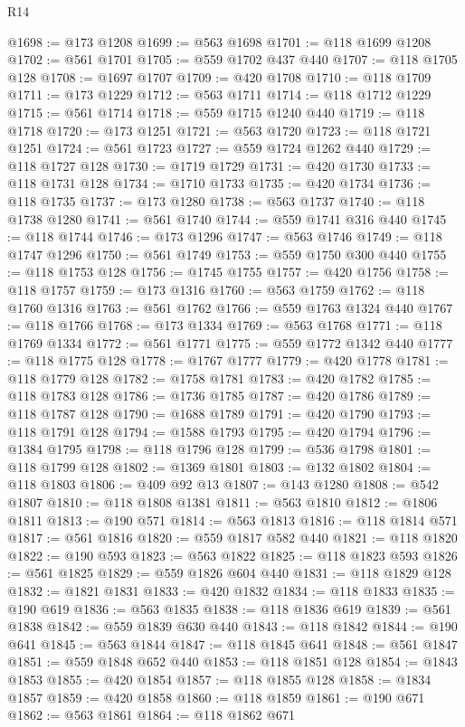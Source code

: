 \begin{lexlean}{R14}
\begin{coremodule}
@1698 := @173 @1208
@1699 := @563 @1698
@1701 := @118 @1699 @1208
@1702 := @561 @1701
@1705 := @559 @1702 @437 @440
@1707 := @118 @1705 @128
@1708 := @1697 @1707
@1709 := @420 @1708
@1710 := @118 @1709
@1711 := @173 @1229
@1712 := @563 @1711
@1714 := @118 @1712 @1229
@1715 := @561 @1714
@1718 := @559 @1715 @1240 @440
@1719 := @118 @1718
@1720 := @173 @1251
@1721 := @563 @1720
@1723 := @118 @1721 @1251
@1724 := @561 @1723
@1727 := @559 @1724 @1262 @440
@1729 := @118 @1727 @128
@1730 := @1719 @1729
@1731 := @420 @1730
@1733 := @118 @1731 @128
@1734 := @1710 @1733
@1735 := @420 @1734
@1736 := @118 @1735
@1737 := @173 @1280
@1738 := @563 @1737
@1740 := @118 @1738 @1280
@1741 := @561 @1740
@1744 := @559 @1741 @316 @440
@1745 := @118 @1744
@1746 := @173 @1296
@1747 := @563 @1746
@1749 := @118 @1747 @1296
@1750 := @561 @1749
@1753 := @559 @1750 @300 @440
@1755 := @118 @1753 @128
@1756 := @1745 @1755
@1757 := @420 @1756
@1758 := @118 @1757
@1759 := @173 @1316
@1760 := @563 @1759
@1762 := @118 @1760 @1316
@1763 := @561 @1762
@1766 := @559 @1763 @1324 @440
@1767 := @118 @1766
@1768 := @173 @1334
@1769 := @563 @1768
@1771 := @118 @1769 @1334
@1772 := @561 @1771
@1775 := @559 @1772 @1342 @440
@1777 := @118 @1775 @128
@1778 := @1767 @1777
@1779 := @420 @1778
@1781 := @118 @1779 @128
@1782 := @1758 @1781
@1783 := @420 @1782
@1785 := @118 @1783 @128
@1786 := @1736 @1785
@1787 := @420 @1786
@1789 := @118 @1787 @128
@1790 := @1688 @1789
@1791 := @420 @1790
@1793 := @118 @1791 @128
@1794 := @1588 @1793
@1795 := @420 @1794
@1796 := @1384 @1795
@1798 := @118 @1796 @128
@1799 := @536 @1798
@1801 := @118 @1799 @128
@1802 := @1369 @1801
@1803 := @132 @1802
@1804 := @118 @1803
@1806 := @409 @92 @13
@1807 := @143 @1280
@1808 := @542 @1807
@1810 := @118 @1808 @1381
@1811 := @563 @1810
@1812 := @1806 @1811
@1813 := @190 @571
@1814 := @563 @1813
@1816 := @118 @1814 @571
@1817 := @561 @1816
@1820 := @559 @1817 @582 @440
@1821 := @118 @1820
@1822 := @190 @593
@1823 := @563 @1822
@1825 := @118 @1823 @593
@1826 := @561 @1825
@1829 := @559 @1826 @604 @440
@1831 := @118 @1829 @128
@1832 := @1821 @1831
@1833 := @420 @1832
@1834 := @118 @1833
@1835 := @190 @619
@1836 := @563 @1835
@1838 := @118 @1836 @619
@1839 := @561 @1838
@1842 := @559 @1839 @630 @440
@1843 := @118 @1842
@1844 := @190 @641
@1845 := @563 @1844
@1847 := @118 @1845 @641
@1848 := @561 @1847
@1851 := @559 @1848 @652 @440
@1853 := @118 @1851 @128
@1854 := @1843 @1853
@1855 := @420 @1854
@1857 := @118 @1855 @128
@1858 := @1834 @1857
@1859 := @420 @1858
@1860 := @118 @1859
@1861 := @190 @671
@1862 := @563 @1861
@1864 := @118 @1862 @671

\end{coremodule}
\end{lexlean}
